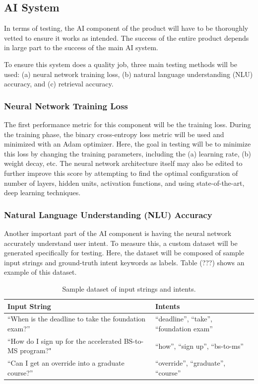 \documentclass[titlepage, 12pt]{article}
\begin{document}
\subsection{AI System}

In terms of testing, the AI component of the product will have to be thoroughly vetted to ensure it works as intended. The success of the entire product depends in large part to the success of the main AI system.

To ensure this system does a quality job, three main testing methods will be used: (a) neural network training loss, (b) natural language understanding (NLU) accuracy, and (c) retrieval accuracy.

\subsubsection{Neural Network Training Loss}

The first performance metric for this component will be the training loss. During the training phase, the binary cross-entropy loss metric will be used and minimized with an Adam optimizer. Here, the goal in testing will be to minimize this loss by changing the training parameters, including the (a) learning rate, (b) weight decay, etc. The neural network architecture itself may also be edited to further improve this score by attempting to find the optimal configuration of number of layers, hidden units, activation functions, and using state-of-the-art, deep learning techniques.

\subsubsection{Natural Language Understanding (NLU) Accuracy}

Another important part of the AI component is having the neural network accurately understand user intent. To measure this, a custom dataset will be generated specifically for testing. Here, the dataset will be composed of sample input strings and ground-truth intent keywords as labels. Table (???) shows an example of this dataset.

\begin{center}
\begin{table}[h]
    \centering
    \begin{tabular}{ L{6cm} L{6cm} }
        \toprule
        \textbf{Input String} & \textbf{Intents}
        \tabularnewline
        \midrule
        “When is the deadline to take the foundation exam?” & “deadline”, “take”, “foundation exam”
        \tabularnewline
        \midrule 
        “How do I sign up for the accelerated BS-to-MS program?" & “how”, “sign up”, “bs-to-ms”
        \tabularnewline
        \midrule
        “Can I get an override into a graduate course?” & “override”, “graduate”, “course”
        \tabularnewline
        \bottomrule
    \end{tabular}
    \caption{Sample dataset of input strings and intents.}
\end{table}
\end{center}
\end{document}
